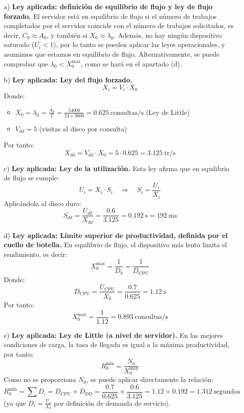 \documentclass[a4paper,12pt]{article}
\begin{document}
    \begin{itemize}
        \item [a)] \textbf{Ley aplicada: definición de equilibrio de flujo y ley de flujo forzado.}  
        El servidor está en equilibrio de flujo si el número de trabajos completados por el servidor coincide con el número de trabajos solicitados, es decir, $C_0 \approx A_0$, y también si $X_0 \approx \lambda_0$.  
        Además, no hay ningún dispositivo saturado ($U_i < 1$), por lo tanto se pueden aplicar las leyes operacionales, y asumimos que estamos en equilibrio de flujo.  
        Alternativamente, se puede comprobar que $\lambda_0 < X_0^{\text{max}}$, como se hará en el apartado (d).  
        
        \item [b)] \textbf{Ley aplicada: Ley del flujo forzado.}  
        $$ X_i = V_i \cdot X_0 $$
        Donde:
        \begin{itemize}
            \item $X_0 = \lambda_0 = \frac{A_0}{T} = \frac{54000}{24 \times 3600} = 0.625\ \text{consultas/s}$  \hfill (Ley de Little)
            \item $V_{dd} = 5$ (visitas al disco por consulta)
        \end{itemize}
        Por tanto:
        $$
        X_{dd} = V_{dd} \cdot X_0 = 5 \cdot 0.625 = \boxed{3.125\ \text{tr/s}}
        $$
    
        \item [c)] \textbf{Ley aplicada: Ley de la utilización.}  
        Esta ley afirma que en equilibrio de flujo se cumple:
        $$ U_i = X_i \cdot S_i \quad \Rightarrow \quad S_i = \frac{U_i}{X_i} $$
        Aplicándola al disco duro:
        $$
        S_{dd} = \frac{U_{dd}}{X_{dd}} = \frac{0.6}{3.125} = 0.192\ \text{s} = \boxed{192\ \text{ms}}
        $$
    
        \item [d)] \textbf{Ley aplicada: Límite superior de productividad, definida por el cuello de botella.}  
        En equilibrio de flujo, el dispositivo más lento limita el rendimiento, es decir:
        $$
        X_0^{\text{max}} = \frac{1}{D_b} = \frac{1}{D_{\text{CPU}}}
        $$
        Donde:
        $$
        D_{\text{CPU}} = \frac{U_{\text{CPU}}}{X_0} = \frac{0.7}{0.625} = 1.12\ \text{s}
        $$
        Por tanto:
        $$
        X_0^{\text{max}} = \frac{1}{1.12} = \boxed{0.893\ \text{consultas/s}}
        $$
    
        \item [e)] \textbf{Ley aplicada: Ley de Little (a nivel de servidor).}  
        En las mejores condiciones de carga, la tasa de llegada es igual a la máxima productividad, por tanto:
        $$
        R_0^{\text{min}} = \frac{N_0}{X_0^{\text{max}}}
        $$
        Como no se proporciona $N_0$, se puede aplicar directamente la relación:
        $$
        R_0^{\text{min}} = \sum D_i = D_{\text{CPU}} + D_{\text{DD}} = \frac{0.7}{0.625} + \frac{0.6}{3.125} = 1.12 + 0.192 = \boxed{1.312\ \text{segundos}}
        $$
        (ya que $D_i = \frac{U_i}{X_0}$ por definición de demanda de servicio).
    \end{itemize}
\end{document}
